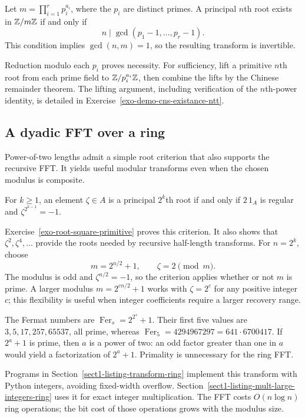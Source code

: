 
\begin{prop}
\label{prop-cns-existance-ntt}
Let $m=\prod_{i=1}^r p_i^{a_i}$, where the $p_i$ are distinct primes.
A principal $n$th root exists in $\mathbb{Z}/m\mathbb{Z}$ if and only if
\[
 n\mid\gcd(p_1-1,\ldots,p_r-1).
\]
This condition implies $\gcd(n,m)=1$, so the resulting transform is
invertible.
\end{prop}
Reduction modulo each $p_i$ proves necessity. For sufficiency, lift a
primitive $n$th root from each prime field to $\mathbb{Z}/p_i^{a_i}\mathbb{Z}$, then
combine the lifts by the Chinese remainder theorem. The lifting argument,
including verification of the $n$th-power identity, is detailed in
Exercise~\ref{exo-demo-cns-existance-ntt}.

\subsection{A dyadic FFT over a ring}
\label{sect2-impl-algo-fft-ring}

Power-of-two lengths admit a simple root criterion that also supports the
recursive FFT. It yields useful modular transforms even when the chosen
modulus is composite.

\begin{prop}
\label{prop-cns-square-root-ring}
For $k\geq1$, an element $\zeta\in A$ is a principal $2^k$th root if and
only if $2\,1_A$ is regular and $\zeta^{2^{k-1}}=-1$.
\end{prop}
Exercise~\ref{exo-root-square-primitive} proves this criterion. It also
shows that $\zeta^2,\zeta^4,\ldots$ provide the roots needed by recursive
half-length transforms.
For $n=2^k$, choose
\[
 m=2^{n/2}+1,\qquad \zeta=2\pmod m.
\]
The modulus is odd and $\zeta^{n/2}=-1$, so the criterion applies whether
or not $m$ is prime. A larger modulus $m=2^{cn/2}+1$ works with
$\zeta=2^c$ for any positive integer $c$; this flexibility is useful when
integer coefficients require a larger recovery range.


\begin{rem}
\label{notation-65}
The Fermat numbers are $\operatorname{Fer}_s=2^{2^s}+1$.
Their first five values are $3,5,17,257,65537$, all prime, whereas
$\operatorname{Fer}_5=4294967297=641\cdot6700417$.
If $2^a+1$ is prime, then $a$ is a power of two: an odd factor greater
than one in $a$ would yield a factorization of $2^a+1$.
Primality is unnecessary for the ring FFT.
\end{rem}
Programs in Section~\ref{sect1-listing-transform-ring} implement this
transform with Python integers, avoiding fixed-width overflow.
Section~\ref{sect1-listing-mult-large-integers-ring} uses it for exact
integer multiplication. The FFT costs $O(n\log n)$ ring operations;
the bit cost of those operations grows with the modulus size.

